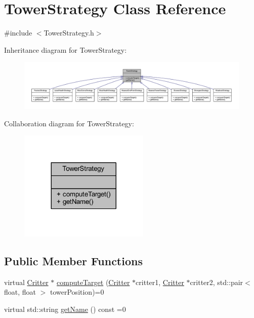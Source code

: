 \hypertarget{class_tower_strategy}{\section{Tower\+Strategy Class Reference}
\label{class_tower_strategy}
}


{\ttfamily \#include $<$Tower\+Strategy.\+h$>$}



Inheritance diagram for Tower\+Strategy\+:
\nopagebreak
\begin{figure}[H]
\begin{center}
\leavevmode
\includegraphics[width=350pt]{class_tower_strategy__inherit__graph}
\end{center}
\end{figure}


Collaboration diagram for Tower\+Strategy\+:
\nopagebreak
\begin{figure}[H]
\begin{center}
\leavevmode
\includegraphics[width=176pt]{class_tower_strategy__coll__graph}
\end{center}
\end{figure}
\subsection*{Public Member Functions}
\begin{DoxyCompactItemize}
\item 
virtual \hyperlink{class_critter}{Critter} $\ast$ \hyperlink{class_tower_strategy_a5cb933a2467f3a99c153049d01e0e246}{compute\+Target} (\hyperlink{class_critter}{Critter} $\ast$critter1, \hyperlink{class_critter}{Critter} $\ast$critter2, std\+::pair$<$ float, float $>$ tower\+Position)=0
\item 
virtual std\+::string \hyperlink{class_tower_strategy_a6cf0bf6f2cd94a9f383bc316c6baa922}{get\+Name} () const =0
\end{DoxyCompactItemize}


